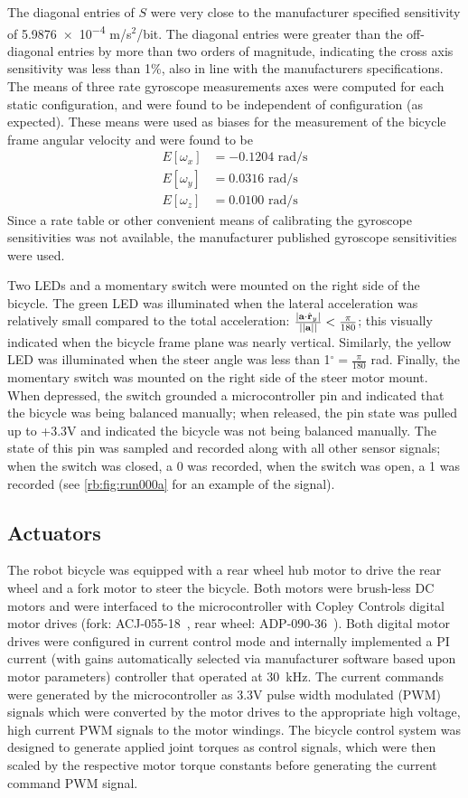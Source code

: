 The diagonal entries of $S$ were very close to the manufacturer specified
sensitivity of \num{5.9876e-4} m/s$^2$/bit. The diagonal entries were greater than
the off-diagonal entries by more than two orders of magnitude, indicating the
cross axis sensitivity was less than 1\%, also in line with the manufacturers
specifications. The means of three rate gyroscope measurements axes were
computed for each static configuration, and were found to be independent of
configuration (as expected). These means were used as biases for the
measurement of the bicycle frame angular velocity and were found to be
\begin{align}
  E[\omega_x] &= -0.1204\text{ rad/s}\\
  E[\omega_y] &=  0.0316 \text{ rad/s}\\
  E[\omega_z] &=  0.0100 \text{ rad/s}
\end{align}
Since a rate table or other convenient means of calibrating the gyroscope
sensitivities was not available, the manufacturer published gyroscope
sensitivities were used.

Two LEDs and a momentary switch were mounted on the right side of the bicycle.
The green LED was illuminated when the lateral acceleration was relatively
small compared to the total acceleration: $\frac{|\mathbf{a} \cdot
\hat{\mathbf{r}}_{y}|}{||\mathbf{a}||} < \frac{\pi}{180}$; this visually indicated when the
bicycle frame plane was nearly vertical. Similarly, the yellow LED was
illuminated when the steer angle was less than 1$^\circ = \frac{\pi}{180}$ rad.
Finally, the momentary switch was mounted on the right side of the steer motor
mount. When depressed, the switch grounded a microcontroller pin and indicated
that the bicycle was being balanced manually; when released, the pin state was
pulled up to +3.3V and indicated the bicycle was not being balanced manually.
The state of this pin was sampled and recorded along with all other sensor
signals; when the switch was closed, a 0 was recorded, when the switch was
open, a 1 was recorded (see \autoref{rb:fig:run000a} for an example of the
signal).

\subsection{Actuators} \label{rb:subsec:actuators}
The robot bicycle was equipped with a rear wheel hub motor to drive the rear
wheel and a fork motor to steer the bicycle. Both motors were brush-less DC
motors and were interfaced to the microcontroller with Copley Controls digital
motor drives (fork: ACJ-055-18~\cite{CopleyACJ}, rear wheel:
ADP-090-36~\cite{CopleyADP}). Both digital motor drives were configured in
current control mode and internally implemented a PI current (with gains
automatically selected via manufacturer software based upon motor parameters)
controller that operated at \SI{30}{\kHz}. The current commands were generated by the
microcontroller as 3.3V pulse width modulated (PWM) signals which were
converted by the motor drives to the appropriate high voltage, high current PWM
signals to the motor windings. The bicycle control system was designed to
generate applied joint torques as control signals, which were then scaled by
the respective motor torque constants before generating the current command PWM
signal.

